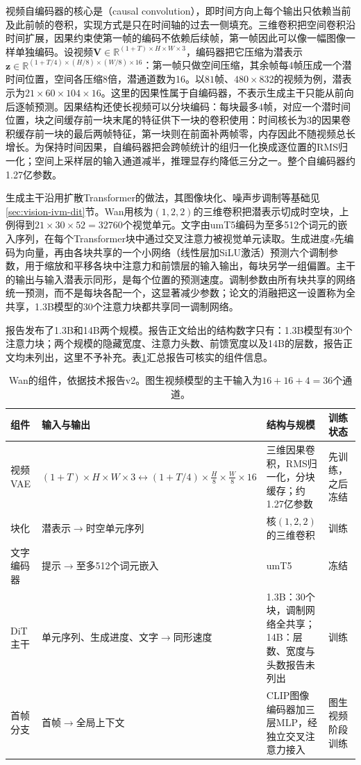 视频自编码器的核心是（causal convolution），即时间方向上每个输出只依赖当前及此前帧的卷积，实现方式是只在时间轴的过去一侧填充。三维卷积把空间卷积沿时间扩展，因果约束使第一帧的编码不依赖后续帧，第一帧因此可以像一幅图像一样单独编码。设视频$\bm V\in\mathbb R^{(1+T)\times H\times W\times3}$，编码器把它压缩为潜表示$\bm z\in\mathbb R^{(1+T/4)\times(H/8)\times(W/8)\times16}$：第一帧只做空间压缩，其余帧每4帧压成一个潜时间位置，空间各压缩8倍，潜通道数为16。以$81$帧、$480\times832$的视频为例，潜表示为$21\times60\times104\times16$。这里的因果性属于自编码器，不表示生成主干只能从前向后逐帧预测。因果结构还使长视频可以分块编码：每块最多4帧，对应一个潜时间位置，块之间缓存前一块末尾的特征供下一块的卷积使用：时间核长为3的因果卷积缓存前一块的最后两帧特征，第一块则在前面补两帧零，内存因此不随视频总长增长。为保持时间因果，自编码器把会跨帧统计的组归一化换成逐位置的RMS归一化；空间上采样层的输入通道减半，推理显存约降低三分之一。整个自编码器约1.27亿参数。

生成主干沿用扩散Transformer的做法，其图像块化、噪声步调制等基础见\ref{sec:vision-ivm-dit}节。Wan用核为$(1,2,2)$的三维卷积把潜表示切成时空块，上例得到$21\times30\times52=32760$个视觉单元。文字由umT5编码为至多512个词元的嵌入序列，在每个Transformer块中通过交叉注意力被视觉单元读取。生成进度$s$先编码为向量，再由各块共享的一个小网络（线性层加SiLU激活）预测六个调制参数，用于缩放和平移各块中注意力和前馈层的输入输出，每块另学一组偏置。主干的输出与输入潜表示同形，是每个位置的预测速度。调制参数由所有块共享的网络统一预测，而不是每块各配一个，这显著减少参数；论文的消融把这一设置称为全共享，1.3B模型的30个注意力块都共享同一调制网络。

报告发布了1.3B和14B两个规模。报告正文给出的结构数字只有：1.3B模型有30个注意力块；两个规模的隐藏宽度、注意力头数、前馈宽度以及14B的层数，报告正文均未列出，这里不予补充。表\ref{tab:vision-models-wan-config}汇总报告可核实的组件信息。

\begin{table}[htbp]
  \centering
  \small
  \begin{tabularx}{\linewidth}{@{}p{14mm}XXp{12mm}@{}}
    \toprule
    组件 & 输入与输出 & 结构与规模 & 训练状态\\
    \midrule
    视频VAE & $(1+T)\times H\times W\times3\leftrightarrow(1+T/4)\times\frac H8\times\frac W8\times16$ & 三维因果卷积，RMS归一化，分块缓存；约1.27亿参数 & 先训练，之后冻结\\
    块化 & 潜表示$\to$时空单元序列 & 核$(1,2,2)$的三维卷积 & 训练\\
    文字编码器 & 提示$\to$至多512个词元嵌入 & umT5 & 冻结\\
    DiT主干 & 单元序列、生成进度、文字$\to$同形速度 & 1.3B：30个块，调制网络全共享；14B：层数、宽度与头数报告未列出 & 训练\\
    首帧分支 & 首帧$\to$全局上下文 & CLIP图像编码器加三层MLP，经独立交叉注意力接入 & 图生视频阶段训练\\
    \bottomrule
  \end{tabularx}
  \caption{Wan的组件，依据技术报告v2。图生视频模型的主干输入为$16+16+4=36$个通道。}
  \label{tab:vision-models-wan-config}
\end{table}

